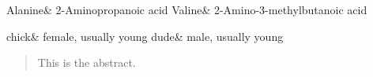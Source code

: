 \begin{nomenclature}
  Alanine& 2-Aminopropanoic acid\cr
  Valine& 2-Amino-3-methylbutanoic acid\cr
\end{nomenclature}

\begin{glossary}
  chick& female, usually young\cr
  dude& male, usually young\cr
\end{glossary}

\begin{abstract}
  This is the abstract.
\end{abstract}

